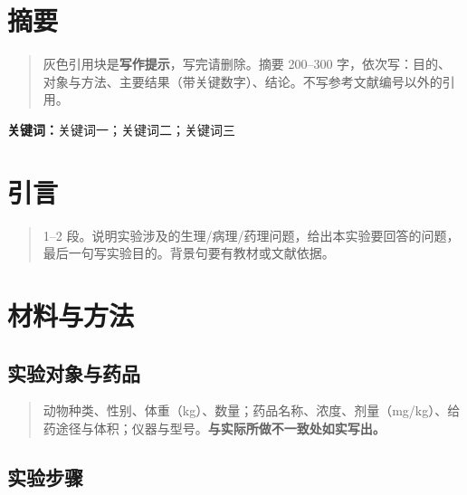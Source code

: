 \documentclass{fdureport}
\begin{document}
\def\fduimage{cover.pdf}\def\fducourse{功能学科综合实验}\def\fdutitle{实验题目（如：家兔高钾血症）}\def\fduexp{}\def\fduclass{年级专业}\def\fduname{姓名}\def\fduid{学号}\def\fdugroup{}\def\fduteacher{}\def\fdudate{2026.\_\_.\_\_}\fducover
{}
\fdufront
\hypertarget{ux6458ux8981}{%
\section*{摘要}\label{ux6458ux8981}}

\begin{quote}
灰色引用块是\textbf{写作提示}，写完请删除。摘要 200--300
字，依次写：目的、对象与方法、主要结果（带关键数字）、结论。不写参考文献编号以外的引用。
\end{quote}

\textbf{关键词：}关键词一；关键词二；关键词三

\hypertarget{ux5f15ux8a00}{%
\section{引言}\label{ux5f15ux8a00}}

\begin{quote}
1--2
段。说明实验涉及的生理/病理/药理问题，给出本实验要回答的问题，最后一句写实验目的。背景句要有教材或文献依据。
\end{quote}

\hypertarget{ux6750ux6599ux4e0eux65b9ux6cd5}{%
\section{材料与方法}\label{ux6750ux6599ux4e0eux65b9ux6cd5}}

\hypertarget{ux5b9eux9a8cux5bf9ux8c61ux4e0eux836fux54c1}{%
\subsection{实验对象与药品}\label{ux5b9eux9a8cux5bf9ux8c61ux4e0eux836fux54c1}}

\begin{quote}
动物种类、性别、体重（kg）、数量；药品名称、浓度、剂量（mg/kg）、给药途径与体积；仪器与型号。\textbf{与实际所做不一致处如实写出。}
\end{quote}

\hypertarget{ux5b9eux9a8cux6b65ux9aa4}{%
\subsection{实验步骤}\label{ux5b9eux9a8cux6b65ux9aa4}}
\end{document}
